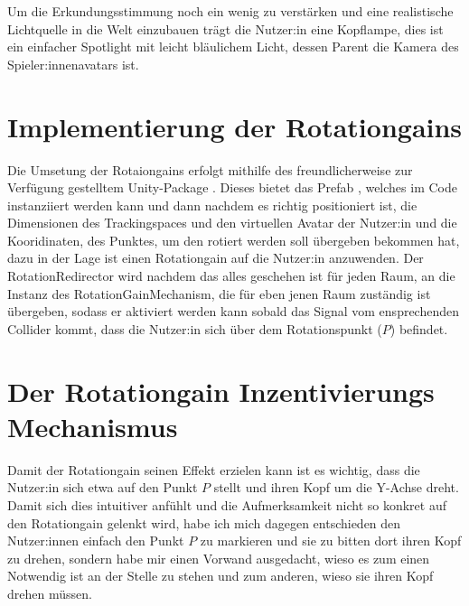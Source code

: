Um die Erkundungsstimmung noch ein wenig zu verstärken und eine realistische Lichtquelle in die Welt einzubauen trägt die Nutzer:in eine Kopflampe, dies ist ein einfacher Spotlight mit leicht bläulichem Licht, dessen Parent die Kamera des Spieler:innenavatars ist.


\section{Implementierung der Rotationgains}

Die Umsetung der Rotaiongains erfolgt mithilfe des
freundlicherweise zur Verfügung gestelltem Unity-Package . Dieses bietet das Prefab , welches im Code instanziiert werden kann und dann nachdem es richtig positioniert ist, die Dimensionen des Trackingspaces und den virtuellen Avatar der Nutzer:in und die Kooridinaten, des Punktes, um den rotiert werden soll übergeben bekommen hat, dazu in der Lage ist einen Rotationgain auf die Nutzer:in anzuwenden. Der RotationRedirector wird nachdem das alles geschehen ist für jeden Raum, an die Instanz des RotationGainMechanism, die für eben jenen Raum zuständig ist übergeben, sodass er aktiviert werden kann sobald das Signal vom ensprechenden Collider kommt, dass die Nutzer:in sich über dem Rotationspunkt ($P$) befindet.

\section{Der Rotationgain Inzentivierungs Mechanismus}
\label{sec:rotgaininc}

Damit der Rotationgain seinen Effekt erzielen kann ist es wichtig, dass die Nutzer:in sich etwa auf den Punkt $P$ stellt und ihren Kopf um die Y-Achse dreht.
Damit sich dies intuitiver anfühlt und die Aufmerksamkeit nicht so konkret auf den Rotationgain gelenkt wird, habe ich mich dagegen entschieden den Nutzer:innen einfach den Punkt $P$ zu markieren und sie zu bitten dort ihren Kopf zu drehen, sondern habe mir einen Vorwand ausgedacht, wieso es zum einen Notwendig ist an der Stelle zu stehen und zum anderen, wieso sie ihren Kopf drehen müssen.

